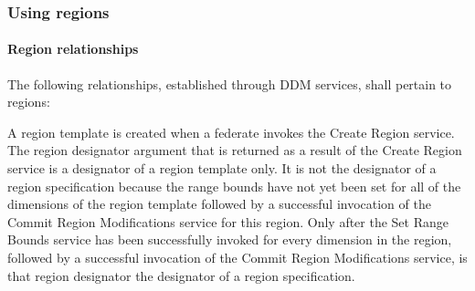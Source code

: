 \begin{compactstdpage}

    \subsubsection{Using regions}

    \paragraph{Region relationships}

    The following relationships, established through DDM services, shall pertain to regions:

    A region template is created when a federate invokes the Create Region service. The region designator argument that is returned as a result of the Create Region service is a designator of a region template only. It is not the designator of a region specification because the range bounds have not yet been set for all of the dimensions of the region template followed by a successful invocation of the Commit Region Modifications service for this region. Only after the Set Range Bounds service has been successfully invoked for every dimension in the region, followed by a successful invocation of the Commit Region Modifications service, is that region designator the designator of a region specification.


\end{compactstdpage}
